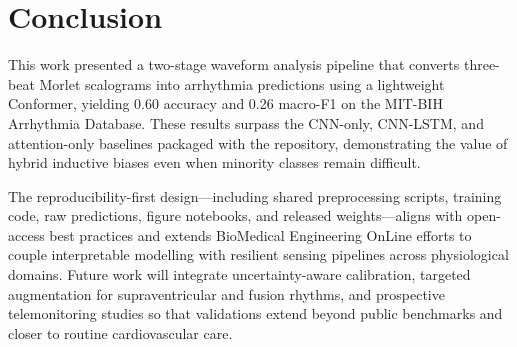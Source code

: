 \section{Conclusion}
This work presented a two-stage waveform analysis pipeline that converts three-beat Morlet scalograms into arrhythmia predictions using a lightweight Conformer, yielding 0.60 accuracy and 0.26 macro-F1 on the MIT-BIH Arrhythmia Database. These results surpass the CNN-only, CNN-LSTM, and attention-only baselines packaged with the repository, demonstrating the value of hybrid inductive biases even when minority classes remain difficult.\cite{Hsieh2025Economic,Hempel2025ECGAging,Gliner2025Interpretability}

The reproducibility-first design—including shared preprocessing scripts, training code, raw predictions, figure notebooks, and released weights—aligns with open-access best practices and extends BioMedical Engineering OnLine efforts to couple interpretable modelling with resilient sensing pipelines across physiological domains.\cite{Jiang2025Hybrid,Stern2024InBed,Aslan2025Poincare} Future work will integrate uncertainty-aware calibration, targeted augmentation for supraventricular and fusion rhythms, and prospective telemonitoring studies so that validations extend beyond public benchmarks and closer to routine cardiovascular care.
